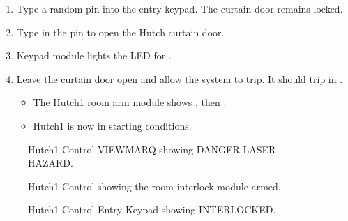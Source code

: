 \documentclass[letterpaper,10pt,english]{sphinxmanual}
\begin{document}
\begin{enumerate}
\item {} 
\sphinxAtStartPar
Type a random pin into the entry keypad.
The curtain door remains locked.

\item {} 
\sphinxAtStartPar
Type in the pin to open the Hutch curtain door.

\item {} 
\sphinxAtStartPar
Keypad module lights the LED for .

\item {} 
\sphinxAtStartPar
Leave the curtain door open and allow the system to trip. It should trip in .
\begin{itemize}
\item {} 
\sphinxAtStartPar
The Hutch\sphinxhyphen{}1 room arm module shows , then .

\item {} 
\sphinxAtStartPar
Hutch\sphinxhyphen{}1 is now in starting conditions.

\end{itemize}

\end{enumerate}

\begin{figure}[htbp]
\centering
\capstart

\noindent{}
\caption{ Hutch\sphinxhyphen{}1 Control VIEWMARQ showing DANGER LASER HAZARD.}\label{\detokenize{testing_documentation/Hutch-1_laser:id7}}\end{figure}

\begin{figure}[htbp]
\centering
\capstart

\noindent{}
\caption{ Hutch\sphinxhyphen{}1 Control showing the room interlock module armed.}\label{\detokenize{testing_documentation/Hutch-1_laser:id8}}\end{figure}

\begin{figure}[htbp]
\centering
\capstart

\noindent{}
\caption{ Hutch\sphinxhyphen{}1 Control Entry Keypad showing INTERLOCKED.}\label{\detokenize{testing_documentation/Hutch-1_laser:id9}}\end{figure}
\end{document}
